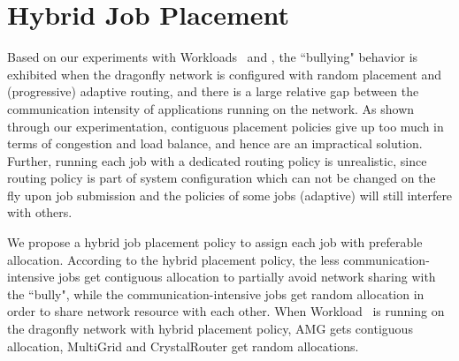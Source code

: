 \section{Hybrid Job Placement}
\label{sec: hybrid placement}

Based on our experiments with Workloads~ and , the ``bullying" behavior is
exhibited when the dragonfly network is configured with random placement and
(progressive) adaptive routing, and there is a large relative gap between the
communication intensity of applications running on the network.
As shown through our experimentation, contiguous placement policies give up too
much in terms of congestion and load balance, and hence are an impractical
solution. Further, running each job with a dedicated routing policy is unrealistic, 
since routing policy is part of system configuration which can not be changed
on the fly upon job submission and the policies of some jobs (adaptive)
will still interfere with others.



We propose a hybrid job placement policy to assign each job with preferable allocation. 
According to the hybrid placement policy, 
the less communication-intensive jobs get contiguous allocation to partially avoid network sharing with the ``bully", 
while the communication-intensive jobs get random allocation in order to share network resource with each other. 
When Workload~ is running on the dragonfly network with hybrid placement policy, 
AMG gets contiguous allocation, MultiGrid and CrystalRouter get random allocations. 


